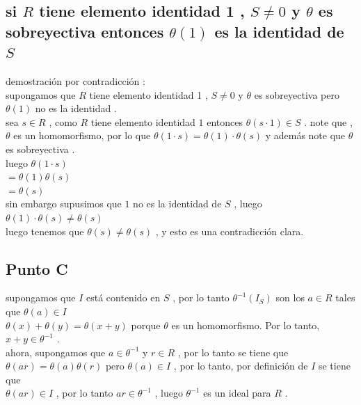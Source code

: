 \documentclass[10pt,a4paper]{article} %
\begin{document}
        \subsection{ si $ R  $ tiene elemento identidad 1 , $ S \not= 0  $
            y $   \theta $ es sobreyectiva entonces $ \theta (1)  $  es la identidad
            de $ S  $  }

            demostración por contradicción :
            \\
            supongamos que $ R  $ tiene elemento identidad 1 , $ S \not= 0
            $  y $ \theta   $ es sobreyectiva pero $ \theta (1)  $ no es la
            identidad .
            \\
            sea $ s \in R  $ , como $ R  $ tiene elemento identidad $ 1  $
            entonces $ \theta (s \cdot 1)  \in S $  . note que , $ \theta   $
            es un homomorfismo, por lo que  $ \theta (1 \cdot s) = \theta
            (1) \cdot \theta (s)  $ y además note que $ \theta  $ es sobreyectiva .
            \\
            luego $ \theta (1 \cdot s)  $
            \\
            $ = \theta (1) \theta (s)  $
            \\
            $ = \theta (s)  $
            \\
            sin embargo supusimos que $ 1  $ no es la identidad de $ S  $ , luego
            \\
            $ \theta(1) \cdot \theta(s) \not= \theta(s)  $
            \\
            luego tenemos que $ \theta (s) \not= \theta (s)  $  , y esto es
            una contradicción clara.

        \subsection{Punto C}
        supongamos que $ I   $ está contenido en $ S  $ , por lo tanto $ \theta
        ^{-1} (I_S)  $ son los $ a \in R  $ tales que $ \theta (a) \in I  $
        \\
        $ \theta (x) + \theta (y) = \theta (x+y)  $  porque $ \theta   $ es un
        homomorfismo. Por lo tanto, $ x+y \in \theta ^{-1}    $ .
        \\
        ahora, supongamos que $ a \in \theta ^{-1}    $ y $ r \in R  $  , por lo tanto se tiene que
        \\
        $ \theta (ar) = \theta (a )\theta (r)  $   pero $ \theta (a) \in I  $ , por lo tanto, por definición de $ I  $ se tiene que
        \\
        $ \theta (ar) \in I  $  , por lo tanto  $ ar \in \theta ^{-1}    $ ,
        luego $ \theta ^{-1}   $ es un ideal para $ R  $   .
\end{document}
